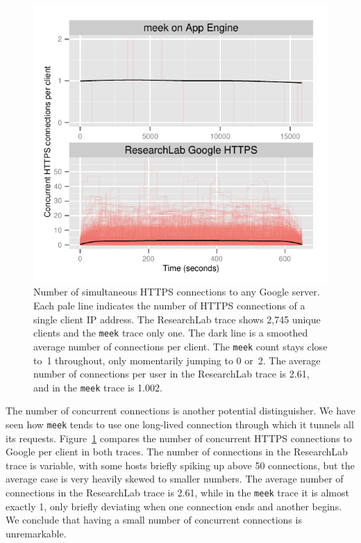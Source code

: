 \documentclass[conference]{IEEEtran}
\newcommand{\meek}{\texttt{meek}\xspace}
\newcommand{\lbl}{ResearchLab\xspace}
\begin{document}
\begin{figure}
\centering
\includegraphics[width=\linewidth]{concurrent.pdf}
\caption{
Number of simultaneous HTTPS connections to any Google server.
Each pale line indicates the number of HTTPS connections
of a single client IP address.
The \lbl trace shows 2,745 unique clients and the \meek trace only one.
The dark line is a smoothed average number of connections per client.
The \meek count stays close to~1 throughout, only momentarily
jumping to 0 or~2.
The average number of connections per user in the \lbl trace is 2.61,
and in the \meek trace is 1.002.
}
\label{fig:concurrent}
\end{figure}

The number of concurrent connections is another potential distinguisher.
We have seen how \meek tends to use one long-lived connection
through which it tunnels all its requests.
Figure~\ref{fig:concurrent} compares the number of concurrent HTTPS connections to
Google per client in both traces.
The number of connections in the \lbl trace is variable,
with some hosts briefly spiking up above 50 connections,
but the average case is very heavily skewed to smaller numbers.
The average number of connections in the \lbl trace is 2.61,
while in the \meek trace it is almost exactly 1, only briefly
deviating when one connection ends and another begins.
We conclude that having a small number of concurrent connections is unremarkable.
\end{document}
